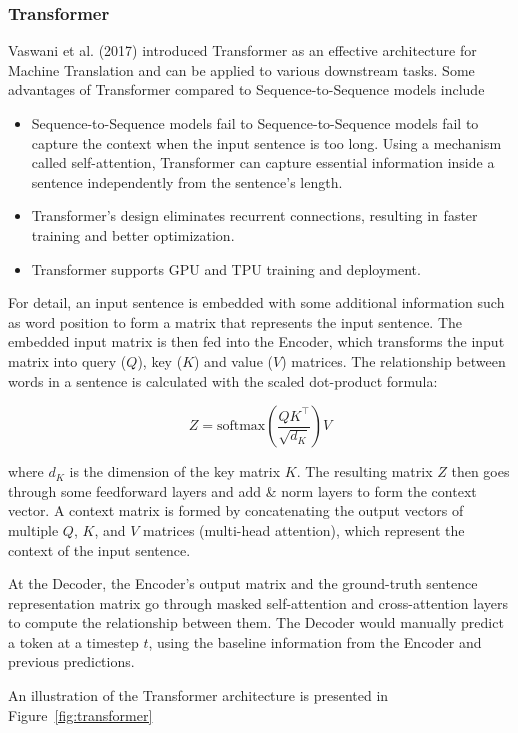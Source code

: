 \documentclass[pdflatex,sn-mathphys]{sn-jnl}%
\theoremstyle{thmstyleone}%
\theoremstyle{thmstyletwo}%
\theoremstyle{thmstylethree}%
\begin{document}
\subsubsection{Transformer}
Vaswani et al. (2017) introduced Transformer\cite{Vaswani2017} as an effective architecture for Machine Translation and can be applied to various downstream tasks. Some advantages of Transformer compared to Sequence-to-Sequence models include
\begin{itemize}
\item Sequence-to-Sequence models fail to Sequence-to-Sequence models fail to capture the context when the input sentence is too long. Using a mechanism called self-attention, Transformer can capture essential information inside a sentence independently from the sentence’s length.
\item Transformer's design eliminates recurrent connections, resulting in faster training and better optimization.
\item Transformer supports GPU and TPU training and deployment.
\end{itemize}

For detail, an input sentence is embedded with some additional information such as word position to form a matrix that represents the input sentence. The embedded input matrix is then fed into the Encoder, which transforms the input matrix into query ($Q$), key ($K$) and value ($V$) matrices. The relationship between words in a sentence is calculated with the scaled dot-product formula:

\begin{equation}
Z = \text{softmax}\left(\frac{QK^{\intercal}}{\sqrt{d_K}}\right)V
\end{equation}

where $d_K$ is the dimension of the key matrix $K$. The resulting matrix $Z$ then goes through some feedforward layers and add \& norm layers to form the context vector. A context matrix is formed by concatenating the output vectors of multiple $Q$, $K$, and $V$ matrices (multi-head attention), which represent the context of the input sentence.

At the Decoder, the Encoder’s output matrix and the ground-truth sentence representation matrix go through masked self-attention and cross-attention layers to compute the relationship between them. The Decoder would manually predict a token at a timestep $t$, using the baseline information from the Encoder and previous predictions.

An illustration of the Transformer architecture is presented in Figure~\ref{fig:transformer}
\end{document}
